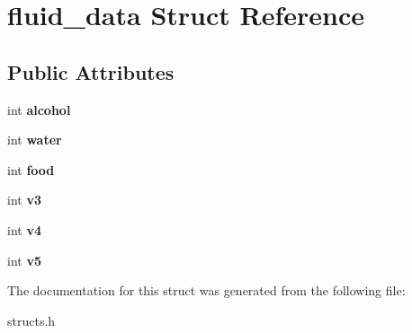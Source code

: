 \hypertarget{structfluid__data}{\section{fluid\-\_\-data Struct Reference}
\label{structfluid__data}
}
\subsection*{Public Attributes}
\begin{DoxyCompactItemize}
\item 
\hypertarget{structfluid__data_a6d15dae8b3aa315315052fe047edd89e}{int {\bfseries alcohol}}\label{structfluid__data_a6d15dae8b3aa315315052fe047edd89e}

\item 
\hypertarget{structfluid__data_a30eedc44b205cac9e29cb28cd054395b}{int {\bfseries water}}\label{structfluid__data_a30eedc44b205cac9e29cb28cd054395b}

\item 
\hypertarget{structfluid__data_af5ca0a549de4f566e247e3598587e624}{int {\bfseries food}}\label{structfluid__data_af5ca0a549de4f566e247e3598587e624}

\item 
\hypertarget{structfluid__data_a589cb2f93512c1c08537d1f0322832a6}{int {\bfseries v3}}\label{structfluid__data_a589cb2f93512c1c08537d1f0322832a6}

\item 
\hypertarget{structfluid__data_ade41b11f5764b1220f32b417530ec211}{int {\bfseries v4}}\label{structfluid__data_ade41b11f5764b1220f32b417530ec211}

\item 
\hypertarget{structfluid__data_af901e42057163d59ae82103e535e3088}{int {\bfseries v5}}\label{structfluid__data_af901e42057163d59ae82103e535e3088}

\end{DoxyCompactItemize}


The documentation for this struct was generated from the following file\-:\begin{DoxyCompactItemize}
\item 
structs.\-h\end{DoxyCompactItemize}
